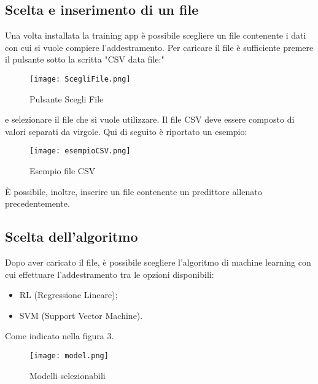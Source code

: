 \documentclass[../manuale-utente.tex]{subfiles}
\begin{document}
\subsection{Scelta e inserimento di un file}
\label{subs:scelta-e-inserimento}
Una volta installata la training app è possibile scegliere un file contenente i dati con cui si vuole compiere l'addestramento. Per caricare il file è sufficiente premere il pulsante sotto la scritta "CSV data file:"

\begin{figure}[h!]
  \begin{center}
    \texttt{[image: ScegliFile.png]}\\
    \caption{Pulsante Scegli File}%
    \label{fig:scegli-file}
  \end{center}
\end{figure}
e selezionare il file che si vuole utilizzare. Il file CSV deve essere composto di valori separati da virgole. Qui di seguito è riportato un esempio:

\begin{figure}[h!]
  \begin{center}
    \texttt{[image: esempioCSV.png]}\\
    \caption{Esempio file CSV}%
    \label{fig:esempioCSV}
  \end{center}
  \end{figure}

  È possibile, inoltre, inserire un file contenente un predittore allenato precedentemente.

\subsection{Scelta dell'algoritmo}
\label{subs:scelta-algoritmo}
Dopo aver caricato il file, è possibile scegliere l'algoritmo di machine learning con cui effettuare l'addestramento tra le opzioni disponibili:
\begin{itemize}
  \item RL (Regressione Lineare);
  \item SVM (Support Vector Machine).
\end{itemize}
Come indicato nella figura 3.

\begin{figure}[h!]
  \begin{center}
    \texttt{[image: model.png]}\\
    \caption{Modelli selezionabili}%
    \label{fig:modelli_selezionabili}
  \end{center}
  \end{figure}
\end{document}
